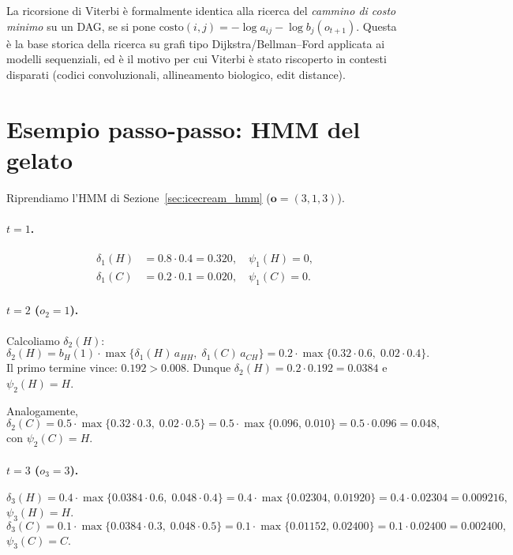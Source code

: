 \documentclass[11pt,a4paper,oneside]{book}
\theoremstyle{plain}
\theoremstyle{definition}
\theoremstyle{remark}
\newcommand{\seqobs}{\mathbf{o}}             %
\newcommand{\vit}{\delta}                    %
\begin{document}
\begin{tcolorbox}[insightbox,title=Viterbi = shortest path]
La ricorsione di Viterbi è formalmente identica alla ricerca del
\emph{cammino di costo minimo} su un DAG, se si pone $\text{costo}(i,j) =
-\log a_{ij} - \log b_j(o_{t+1})$. Questa è la base storica della
ricerca su grafi tipo Dijkstra/Bellman--Ford applicata ai modelli
sequenziali, ed è il motivo per cui Viterbi è stato riscoperto in
contesti disparati (codici convoluzionali, allineamento biologico,
edit distance).
\end{tcolorbox}

\section{Esempio passo-passo: HMM del gelato}\label{sec:viterbi_example}

Riprendiamo l'HMM di Sezione~\ref{sec:icecream_hmm} ($\seqobs=(3,1,3)$).

\paragraph{$t=1$.}
\begin{align*}
\vit_1(H) &= 0.8\cdot 0.4 = 0.320,\quad \psi_1(H)=0,\\
\vit_1(C) &= 0.2\cdot 0.1 = 0.020,\quad \psi_1(C)=0.
\end{align*}

\paragraph{$t=2$ ($o_2=1$).}
Calcoliamo $\vit_2(H)$:
\[
\vit_2(H) = b_H(1)\cdot\max\bigl\{\vit_1(H)\,a_{HH},\;\vit_1(C)\,a_{CH}\bigr\}
= 0.2\cdot\max\{0.32\cdot 0.6,\;0.02\cdot 0.4\}.
\]
Il primo termine vince: $0.192 > 0.008$. Dunque
$\vit_2(H)=0.2\cdot 0.192 = 0.0384$ e $\psi_2(H)=H$.

Analogamente,
\[
\vit_2(C) = 0.5\cdot\max\{0.32\cdot 0.3,\;0.02\cdot 0.5\}
= 0.5\cdot\max\{0.096,\,0.010\} = 0.5\cdot 0.096 = 0.048,
\]
con $\psi_2(C)=H$.

\paragraph{$t=3$ ($o_3=3$).}
\[
\vit_3(H) = 0.4\cdot\max\{0.0384\cdot 0.6,\;0.048\cdot 0.4\}
= 0.4\cdot\max\{0.02304,\,0.01920\} = 0.4\cdot 0.02304 = 0.009216,
\]
$\psi_3(H)=H$.
\[
\vit_3(C) = 0.1\cdot\max\{0.0384\cdot 0.3,\;0.048\cdot 0.5\}
= 0.1\cdot\max\{0.01152,\,0.02400\} = 0.1\cdot 0.02400 = 0.002400,
\]
$\psi_3(C)=C$.
\end{document}
